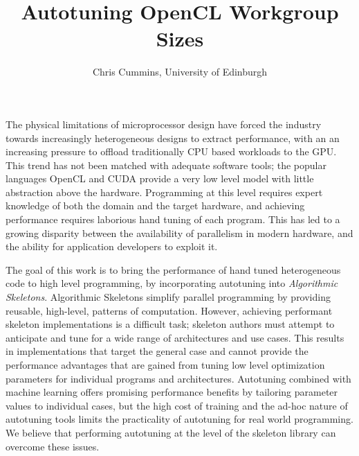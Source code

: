 %
%
%
%
%
%


\usepackage{pdfpages}



\title{Autotuning OpenCL Workgroup Sizes}

\author{Chris Cummins, University of Edinburgh}

\maketitle

The physical limitations of microprocessor design have forced the
industry towards increasingly heterogeneous designs to extract
performance, with an an increasing pressure to offload traditionally
CPU based workloads to the GPU. This trend has not been matched with
adequate software tools; the popular languages OpenCL and CUDA provide
a very low level model with little abstraction above the
hardware. Programming at this level requires expert knowledge of both
the domain and the target hardware, and achieving performance requires
laborious hand tuning of each program. This has led to a growing
disparity between the availability of parallelism in modern hardware,
and the ability for application developers to exploit it.

The goal of this work is to bring the performance of hand tuned
heterogeneous code to high level programming, by incorporating
autotuning into \textit{Algorithmic Skeletons}. Algorithmic Skeletons
simplify parallel programming by providing reusable, high-level,
patterns of computation. However, achieving performant skeleton
implementations is a difficult task; skeleton authors must attempt to
anticipate and tune for a wide range of architectures and use
cases. This results in implementations that target the general case
and cannot provide the performance advantages that are gained from
tuning low level optimization parameters for individual programs and
architectures. Autotuning combined with machine learning offers
promising performance benefits by tailoring parameter values to
individual cases, but the high cost of training and the ad-hoc nature
of autotuning tools limits the practicality of autotuning for real
world programming. We believe that performing autotuning at the level
of the skeleton library can overcome these issues.

